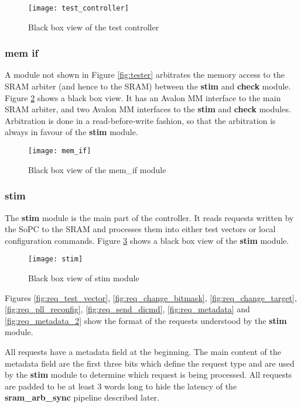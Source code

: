 \begin{figure}
 \centering
 \texttt{[image: test\_controller]}
 \caption{Black box view of the test controller}
 \label{fig:bb_test_controller}
\end{figure}



\subsubsection{mem if}
A module not shown in Figure \ref{fig:tester} arbitrates the memory access to the SRAM arbiter (and hence to the SRAM)
 between the \textbf{stim} and \textbf{check} module. Figure \ref{fig:bb_mem_if} shows a black box view. It has
an Avalon MM interface to the main SRAM arbiter, and two Avalon MM interfaces to the \textbf{stim} and
\textbf{check} modules. Arbitration is done in a read-before-write fashion, so that the arbitration is always
in favour of the \textbf{stim} module.

\begin{figure}
 \centering
 \texttt{[image: mem\_if]}
 \caption{Black box view of the mem\_if module}
 \label{fig:bb_mem_if}
\end{figure}



\subsubsection{stim}
The \textbf{stim} module is the main part of the controller. It reads requests written by the SoPC to the SRAM and
processes them into either test vectors or local configuration commands. Figure \ref{fig:bb_stim} shows a black box
view of the \textbf{stim} module.

\begin{figure}
 \centering
 \texttt{[image: stim]}
 \caption{Black box view of stim module}
 \label{fig:bb_stim}
\end{figure}



Figures \ref{fig:req_test_vector}, \ref{fig:req_change_bitmask},
\ref{fig:req_change_target}, \ref{fig:req_pll_reconfig}, \ref{fig:req_send_dicmd}, \ref{fig:req_metadata} and \ref{fig:req_metadata_2}
show the format of the requests understood by the \textbf{stim} module.

All requests have a metadata field at the beginning. The main content of the metadata field are the first three bits
which define the request type and are used by the \textbf{stim} module to determine which request is being processed.
All requests are padded to be at least 3 words long to hide the latency of the \textbf{sram\_arb\_sync} pipeline described
later.

